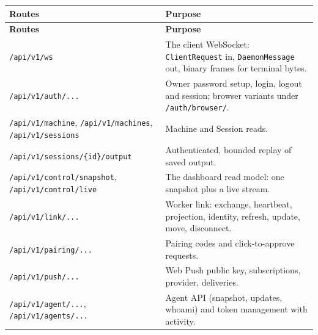 \begin{small}
\begin{longtable}{>{\raggedright\arraybackslash}p{0.410\dimexpr \linewidth-4\tabcolsep\relax}>{\raggedright\arraybackslash}p{0.590\dimexpr \linewidth-4\tabcolsep\relax}}
\toprule
\textbf{Routes} & \textbf{Purpose} \\
\midrule
\endfirsthead
\toprule
\textbf{Routes} & \textbf{Purpose} \\
\midrule
\endhead
\texttt{/\allowbreak{}api/\allowbreak{}v1/\allowbreak{}ws} & The client WebSocket: \texttt{ClientRequest} in, \texttt{DaemonMessage} out, binary frames for terminal bytes. \\
\texttt{/\allowbreak{}api/\allowbreak{}v1/\allowbreak{}auth/\allowbreak{}.\allowbreak{}.\allowbreak{}.\allowbreak{}} & Owner password setup, login, logout and session; browser variants under \texttt{/\allowbreak{}auth/\allowbreak{}browser/\allowbreak{}}. \\
\texttt{/\allowbreak{}api/\allowbreak{}v1/\allowbreak{}machine}, \texttt{/\allowbreak{}api/\allowbreak{}v1/\allowbreak{}machines}, \texttt{/\allowbreak{}api/\allowbreak{}v1/\allowbreak{}sessions} & Machine and Session reads. \\
\texttt{/\allowbreak{}api/\allowbreak{}v1/\allowbreak{}sessions/\allowbreak{}\{id\}/\allowbreak{}output} & Authenticated, bounded replay of saved output. \\
\texttt{/\allowbreak{}api/\allowbreak{}v1/\allowbreak{}control/\allowbreak{}snapshot}, \texttt{/\allowbreak{}api/\allowbreak{}v1/\allowbreak{}control/\allowbreak{}live} & The dashboard read model: one snapshot plus a live stream. \\
\texttt{/\allowbreak{}api/\allowbreak{}v1/\allowbreak{}link/\allowbreak{}.\allowbreak{}.\allowbreak{}.\allowbreak{}} & Worker link: exchange, heartbeat, projection, identity, refresh, update, move, disconnect. \\
\texttt{/\allowbreak{}api/\allowbreak{}v1/\allowbreak{}pairing/\allowbreak{}.\allowbreak{}.\allowbreak{}.\allowbreak{}} & Pairing codes and click-to-approve requests. \\
\texttt{/\allowbreak{}api/\allowbreak{}v1/\allowbreak{}push/\allowbreak{}.\allowbreak{}.\allowbreak{}.\allowbreak{}} & Web Push public key, subscriptions, provider, deliveries. \\
\texttt{/\allowbreak{}api/\allowbreak{}v1/\allowbreak{}agent/\allowbreak{}.\allowbreak{}.\allowbreak{}.\allowbreak{}}, \texttt{/\allowbreak{}api/\allowbreak{}v1/\allowbreak{}agents/\allowbreak{}.\allowbreak{}.\allowbreak{}.\allowbreak{}} & Agent API (snapshot, updates, whoami) and token management with activity. \\

\end{longtable}
\end{small}
